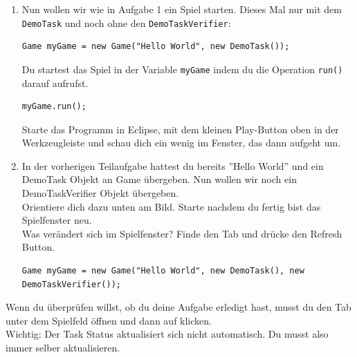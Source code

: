 
\label{ex3}

\begin{enumerate}
    \item Nun wollen wir wie in Aufgabe 1 ein Spiel starten.
        Dieses Mal nur mit dem \lstinline{DemoTask} und noch ohne den \lstinline{DemoTaskVerifier}:

    \begin{lstlisting}
Game myGame = new Game("Hello World", new DemoTask());
    \end{lstlisting}

    Du startest das Spiel in der Variable \lstinline{myGame} indem du die Operation \lstinline{run()} darauf aufrufst.

    \begin{lstlisting}
myGame.run();
    \end{lstlisting}

    Starte das Programm in Eclipse, mit dem kleinen Play-Button oben in der Werkzeugleiste und schau dich ein wenig im Fenster, das dann aufgeht um.

    \vspace{5mm}

    \item In der vorherigen Teilaufgabe hattest du bereits ''Hello World'' und ein DemoTask Objekt an Game übergeben.
        Nun wollen wir noch ein DemoTaskVerifier Objekt übergeben.\\
        Orientiere dich dazu unten am Bild. Starte nachdem du fertig bist das Spielfenster neu. \\

        Was verändert sich im Spielfenster?
        Finde den  Tab und drücke den Refresh Button.

    \begin{lstlisting}
Game myGame = new Game("Hello World", new DemoTask(), new DemoTaskVerifier());
    \end{lstlisting}

\end{enumerate}


\begin{Infobox}
    Wenn du überprüfen willst, ob du deine Aufgabe erledigt hast, musst du den  Tab unter dem Spielfeld öffnen und dann auf  klicken.\\

    Wichtig: Der Task Status aktualisiert sich nicht automatisch. Du musst also immer selber aktualisieren.
\end{Infobox}


